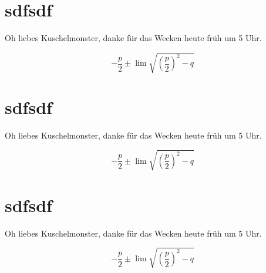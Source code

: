 \documentclass[12pt,ngerman]{scrartcl}
\begin{document}
\section{sdfsdf}

Oh liebes Kuschelmonster, danke für das Wecken heute früh um 5 Uhr.

\[
- \frac{p}{2} \pm \lim \sqrt{ \left( \frac{p}{2}\right)^2 -q  }
\]


\courgette
\section{sdfsdf}

Oh liebes Kuschelmonster, danke für das Wecken heute früh um 5 Uhr.

\[
- \frac{p}{2} \pm \lim \sqrt{ \left( \frac{p}{2}\right)^2 -q  }
\]

\hand
\section{sdfsdf}

Oh liebes Kuschelmonster, danke für das Wecken heute früh um 5 Uhr.

\[
- \frac{p}{2} \pm \lim \sqrt{ \left( \frac{p}{2}\right)^2 -q  }
\]

\ms \blindtext
\end{document}
